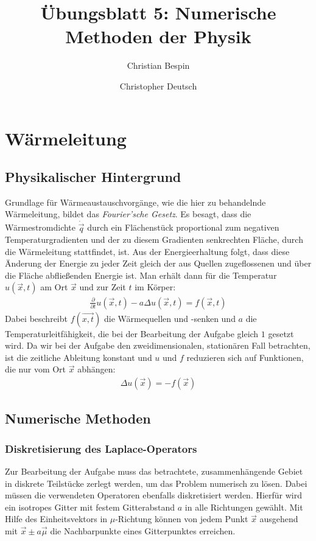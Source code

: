 \documentclass[10pt,a4paper]{article}
\author{Christian Bespin \and Christopher Deutsch}
\title{Übungsblatt 5: Numerische Methoden der Physik}
\begin{document}
\maketitle

\setcounter{section}{4}

\section{Wärmeleitung}

\subsection{Physikalischer Hintergrund}
Grundlage für Wärmeaustauschvorgänge, wie die hier zu behandelnde Wärmeleitung, bildet das \emph{Fourier'sche Gesetz}. Es besagt, dass die Wärmestromdichte $\dot{\vec{q}}$ durch ein Flächenstück proportional zum negativen Temperaturgradienten und der zu diesem Gradienten senkrechten Fläche, durch die Wärmeleitung stattfindet, ist. Aus der Energieerhaltung folgt, dass diese Änderung der Energie zu jeder Zeit gleich der aus Quellen zugeflossenen und über die Fläche abfließenden Energie ist. Man erhält dann für die Temperatur $u(\vec{x},t)$ am Ort $\vec{x}$ und zur Zeit $t$ im Körper:
\begin{align}  
\frac{\partial}{\partial t}u(\vec{x},t)-a \Delta u(\vec{x},t)=f(\vec{x},t)
\end{align}
Dabei beschreibt $f(\vec{x,t})$ die Wärmequellen und -senken und $a$ die Temperaturleitfähigkeit, die bei der Bearbeitung der Aufgabe gleich $1$ gesetzt wird. Da wir bei der Aufgabe den zweidimensionalen, stationären Fall betrachten, ist die zeitliche Ableitung konstant und $u$ und $f$ reduzieren sich auf Funktionen, die nur vom Ort $\vec{x}$ abhängen:
\begin{align}
\Delta u(\vec{x})=-f(\vec{x})
\label{eqn:dgl}
\end{align}

\subsection{Numerische Methoden}
\subsubsection{Diskretisierung des Laplace-Operators}
Zur Bearbeitung der Aufgabe muss das betrachtete, zusammenhängende Gebiet in diskrete Teilstücke zerlegt werden, um das Problem numerisch zu lösen. Dabei müssen die verwendeten Operatoren ebenfalls diskretisiert werden. Hierfür wird ein isotropes Gitter mit festem Gitterabstand $a$ in alle Richtungen gewählt. Mit Hilfe des Einheitsvektors in $\mu$-Richtung können von jedem Punkt $\vec{x}$ ausgehend mit $\vec{x} \pm a\vec{\mu}$ die Nachbarpunkte eines Gitterpunktes erreichen.
\end{document}
